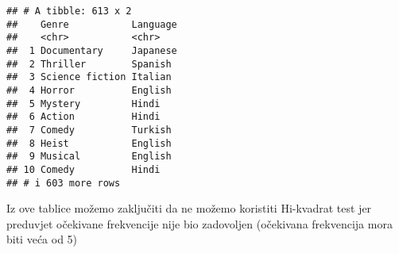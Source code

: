 \documentclass[
]{article}
\newenvironment{Shaded}{\begin{snugshade}}{\end{snugshade}}
\newcommand{\CommentTok}[1]{\textcolor[rgb]{0.56,0.35,0.01}{\textit{#1}}}
\newcommand{\FunctionTok}[1]{\textcolor[rgb]{0.13,0.29,0.53}{\textbf{#1}}}
\newcommand{\NormalTok}[1]{#1}
\newcommand{\OtherTok}[1]{\textcolor[rgb]{0.56,0.35,0.01}{#1}}
\newcommand{\SpecialCharTok}[1]{\textcolor[rgb]{0.81,0.36,0.00}{\textbf{#1}}}
\begin{document}
\begin{verbatim}
## # A tibble: 613 x 2
##    Genre           Language
##    <chr>           <chr>   
##  1 Documentary     Japanese
##  2 Thriller        Spanish 
##  3 Science fiction Italian 
##  4 Horror          English 
##  5 Mystery         Hindi   
##  6 Action          Hindi   
##  7 Comedy          Turkish 
##  8 Heist           English 
##  9 Musical         English 
## 10 Comedy          Hindi   
## # i 603 more rows
\end{verbatim}

\begin{Shaded}
\end{Shaded}

Iz ove tablice možemo zaključiti da ne možemo koristiti Hi-kvadrat test
jer preduvjet očekivane frekvencije nije bio zadovoljen (očekivana
frekvencija mora biti veća od 5)

\begin{Shaded}
\end{Shaded}
\end{document}
